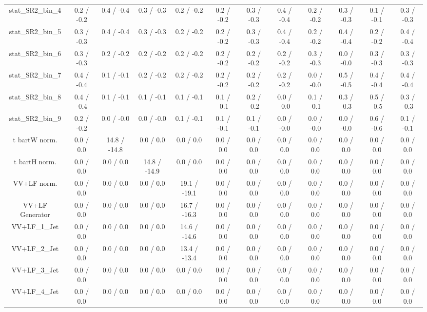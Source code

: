 \begin{table}[htbp]
\begin{center}
\begin{tabular}{|c|c|c|c|c|c|c|c|c|c|c|c|}
 stat_SR2_bin_4 & 0.2 / -0.2 & 0.4 / -0.4 & 0.3 / -0.3 & 0.2 / -0.2 & 0.2 / -0.2 & 0.3 / -0.3 & 0.4 / -0.4 & 0.2 / -0.2 & 0.3 / -0.3 & 0.1 / -0.1 & 0.3 / -0.3 \\ 
 stat_SR2_bin_5 & 0.3 / -0.3 & 0.4 / -0.4 & 0.3 / -0.3 & 0.2 / -0.2 & 0.2 / -0.2 & 0.3 / -0.3 & 0.4 / -0.4 & 0.2 / -0.2 & 0.4 / -0.4 & 0.2 / -0.2 & 0.4 / -0.4 \\ 
 stat_SR2_bin_6 & 0.3 / -0.3 & 0.2 / -0.2 & 0.2 / -0.2 & 0.2 / -0.2 & 0.2 / -0.2 & 0.2 / -0.2 & 0.2 / -0.2 & 0.3 / -0.3 & 0.0 / -0.0 & 0.3 / -0.3 & 0.3 / -0.3 \\ 
 stat_SR2_bin_7 & 0.4 / -0.4 & 0.1 / -0.1 & 0.2 / -0.2 & 0.2 / -0.2 & 0.2 / -0.2 & 0.2 / -0.2 & 0.2 / -0.2 & 0.0 / -0.0 & 0.5 / -0.5 & 0.4 / -0.4 & 0.4 / -0.4 \\ 
 stat_SR2_bin_8 & 0.4 / -0.4 & 0.1 / -0.1 & 0.1 / -0.1 & 0.1 / -0.1 & 0.1 / -0.1 & 0.2 / -0.2 & 0.0 / -0.0 & 0.1 / -0.1 & 0.3 / -0.3 & 0.5 / -0.5 & 0.3 / -0.3 \\ 
 stat_SR2_bin_9 & 0.2 / -0.2 & 0.0 / -0.0 & 0.0 / -0.0 & 0.1 / -0.1 & 0.1 / -0.1 & 0.1 / -0.1 & 0.0 / -0.0 & 0.0 / -0.0 & 0.0 / -0.0 & 0.6 / -0.6 & 0.1 / -0.1 \\ 
  t bar{t}W norm. & 0.0 / 0.0 & 14.8 / -14.8 & 0.0 / 0.0 & 0.0 / 0.0 & 0.0 / 0.0 & 0.0 / 0.0 & 0.0 / 0.0 & 0.0 / 0.0 & 0.0 / 0.0 & 0.0 / 0.0 & 0.0 / 0.0 \\ 
  t bar{t}H norm. & 0.0 / 0.0 & 0.0 / 0.0 & 14.8 / -14.9 & 0.0 / 0.0 & 0.0 / 0.0 & 0.0 / 0.0 & 0.0 / 0.0 & 0.0 / 0.0 & 0.0 / 0.0 & 0.0 / 0.0 & 0.0 / 0.0 \\ 
  VV+LF norm. & 0.0 / 0.0 & 0.0 / 0.0 & 0.0 / 0.0 & 19.1 / -19.1 & 0.0 / 0.0 & 0.0 / 0.0 & 0.0 / 0.0 & 0.0 / 0.0 & 0.0 / 0.0 & 0.0 / 0.0 & 0.0 / 0.0 \\ 
  VV+LF Generator & 0.0 / 0.0 & 0.0 / 0.0 & 0.0 / 0.0 & 16.7 / -16.3 & 0.0 / 0.0 & 0.0 / 0.0 & 0.0 / 0.0 & 0.0 / 0.0 & 0.0 / 0.0 & 0.0 / 0.0 & 0.0 / 0.0 \\ 
  VV+LF_1_Jet & 0.0 / 0.0 & 0.0 / 0.0 & 0.0 / 0.0 & 14.6 / -14.6 & 0.0 / 0.0 & 0.0 / 0.0 & 0.0 / 0.0 & 0.0 / 0.0 & 0.0 / 0.0 & 0.0 / 0.0 & 0.0 / 0.0 \\ 
  VV+LF_2_Jet & 0.0 / 0.0 & 0.0 / 0.0 & 0.0 / 0.0 & 13.4 / -13.4 & 0.0 / 0.0 & 0.0 / 0.0 & 0.0 / 0.0 & 0.0 / 0.0 & 0.0 / 0.0 & 0.0 / 0.0 & 0.0 / 0.0 \\ 
  VV+LF_3_Jet & 0.0 / 0.0 & 0.0 / 0.0 & 0.0 / 0.0 & 0.0 / 0.0 & 0.0 / 0.0 & 0.0 / 0.0 & 0.0 / 0.0 & 0.0 / 0.0 & 0.0 / 0.0 & 0.0 / 0.0 & 0.0 / 0.0 \\ 
  VV+LF_4_Jet & 0.0 / 0.0 & 0.0 / 0.0 & 0.0 / 0.0 & 0.0 / 0.0 & 0.0 / 0.0 & 0.0 / 0.0 & 0.0 / 0.0 & 0.0 / 0.0 & 0.0 / 0.0 & 0.0 / 0.0 & 0.0 / 0.0 \\ 

\end{tabular}
\end{center}
\end{table}
